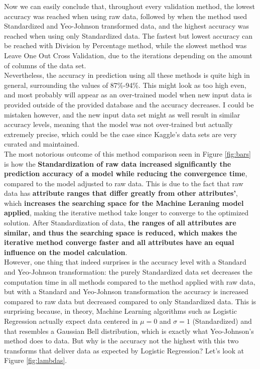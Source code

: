 \documentclass[11pt]{article}
\begin{document}
Now we can easily conclude that, throughout every validation method, the lowest accuracy was reached when using raw data, followed by when the method used Standardized and Yeo-Johnson transformed data, and the highest accuracy was reached when using only Standardized data. The fastest but lowest accuracy can be reached with Division by Percentage method, while the slowest method was Leave One Out Cross Validation, due to the iterations depending on the amount of columns of the data set.
\\

Nevertheless, the accuracy in prediction using all these methods is quite high in general, surrounding the values of 87\%-94\%. This might look as too high even, and most probably will appear as an over-trained model when new input data is provided outside of the provided database and the accuracy decreases. I could be mistaken however, and the new input data set might as well result in similar accuracy levels, meaning that the model was not over-trained but actually extremely precise, which could be the case since Kaggle's data sets are very curated and maintained.
\\

The most notorious outcome of this method comparison seen in Figure \ref{fig:bars} is how the \textbf{Standardization of raw data increased significantly the prediction accuracy of a model while reducing the convergence time}, compared to the model adjusted to raw data. This is due to the fact that raw data has \textbf{attribute ranges that differ greatly from other attributes'}, which \textbf{increases the searching space for the Machine Leraning model applied}, making the iterative method take longer to converge to the optimized solution. After Standardization of data, \textbf{the ranges of all attributes are similar, and thus the searching space is reduced, which makes the iterative method converge faster and all attributes have an equal influence on the model calculation}.
\\

However, one thing that indeed surprises is the accuracy level with a Standard and Yeo-Johnson transformation: the purely Standardized data set decreases the computation time in all methods compared to the method applied with raw data, but with a Standard and Yeo-Johnson transformation the accuracy is increased compared to raw data but decreased compared to only Standardized data. This is surprising because, in theory, Machine Learning algorithms such as Logistic Regression actually expect data centered in $\mu = 0$ and $\sigma = 1$ (Standardized) and that resembles a Gaussian Bell distribution, which is exactly what Yeo-Johnson's method does to data. But why is the accuracy not the highest with this two transforms that deliver data as expected by Logistic Regression? Let's look at Figure \ref{fig:lambdas}.
\\
\end{document}
